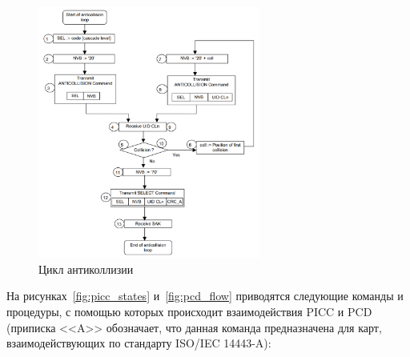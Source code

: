\begin{figure}[H]
    \centering
    \includegraphics[width=0.65\textwidth]{images/research/anticollision_loop}
    \caption{\centering Цикл антиколлизии}
    \label{fig:anticollision_loop}
\end{figure}

На рисунках~\ref{fig:picc_states} и~\ref{fig:pcd_flow} приводятся следующие команды и процедуры, с помощью которых происходит взаимодействия PICC и PCD (приписка <<A>> обозначает, что данная команда предназначена для карт, взаимодействующих по стандарту ISO/IEC 14443-A):


